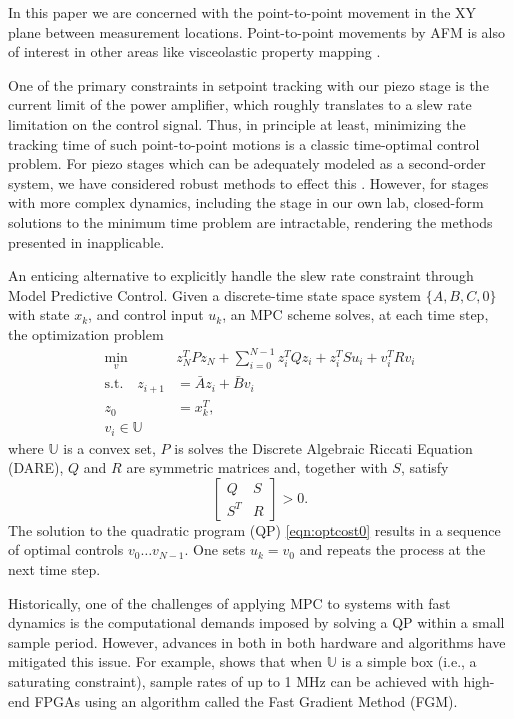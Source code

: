 \documentclass[journal,twocolumn,twoside]{IEEEtran}
\newcommand{\Ad}{\ensuremath{\bar A }\xspace}
\newcommand{\Bd}{\ensuremath{\bar B }\xspace}
\begin{document}
In this paper we are concerned with the point-to-point movement in the XY plane between measurement locations. 
Point-to-point movements by AFM is also of interest in other areas like visceolastic property mapping \cite{killgore_visceolastic_2011}.

One of the primary constraints in setpoint tracking with our piezo stage is the current limit of the power amplifier,  which roughly translates to a slew rate limitation on the control signal. Thus, 
in principle at least, minimizing the tracking time of such point-to-point motions is a classic time-optimal control problem. For piezo stages which can be adequately modeled as a second-order system, we have considered robust methods to effect this \cite{braker_proximate_2017}. However, for stages with more complex dynamics,  including the stage in our own lab, closed-form solutions to the minimum time problem are intractable, rendering the methods presented in \cite{braker_proximate_2017} inapplicable.


An enticing alternative to explicitly handle the slew rate constraint through Model Predictive Control.
Given a discrete-time state space system $\{A,B,C,0\}$ with state $x_k$, and control input $u_k$, an MPC scheme solves, at each time step, the optimization problem 
\begin{subequations}
\begin{align}
\min_{v}\:\:& z^T_{N}Pz_{N} + \sum_{i=0}^{N-1}z_{i}^{T}Qz_{i} + z^T_iSu_i + v^{T}_{i}Rv_{i} \\
 \text{s.t.} \quad z_{i+1} &= \Ad z_{i} + \Bd v_{i}\\
z_{0} &= x^T_{k}, \\
v_i  \in \mathds{U}
\end{align}\label{eqn:optcost0}
\end{subequations}
where $\mathds{U}$ is a convex set, $P$ is solves the Discrete Algebraic Riccati Equation (DARE), $Q$ and $R$ are symmetric matrices and, together with $S$, satisfy
\begin{equation}
  \begin{bmatrix}
    Q & S\\S^T &R
  \end{bmatrix} > 0.
\end{equation}
The solution to the quadratic program (QP) \eqref{eqn:optcost0} results in a sequence of optimal controls $v_0\dots v_{N-1}$. One sets $u_k = v_0$ and repeats the process at the next time step.

Historically, one of the challenges of applying MPC to systems with fast dynamics is the computational demands imposed by solving a QP within a small sample period. However, advances in both in both hardware and algorithms have mitigated this issue. For example, \cite{Jerez_Trans_2014} shows that when $\mathds{U}$ is a simple box (i.e., a saturating constraint), sample rates of up to 1 MHz can be achieved with high-end FPGAs using an algorithm called the Fast Gradient Method (FGM).
\end{document}

